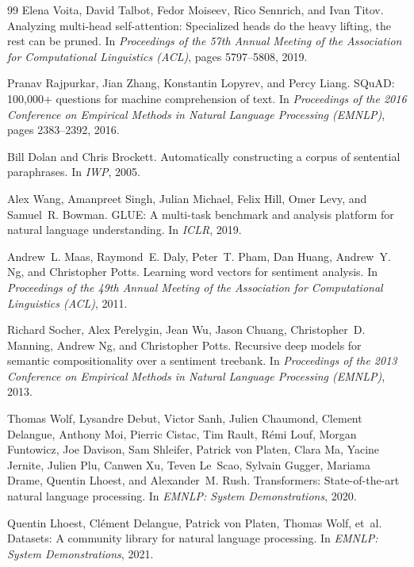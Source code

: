 \documentclass[11pt,a4paper]{article}
\begin{document}
\begin{thebibliography}{99}
Elena Voita, David Talbot, Fedor Moiseev, Rico Sennrich, and Ivan Titov.
Analyzing multi-head self-attention: Specialized heads do the heavy lifting, the rest can be pruned.
In \emph{Proceedings of the 57th Annual Meeting of the Association for Computational Linguistics (ACL)}, pages 5797--5808, 2019.

Pranav Rajpurkar, Jian Zhang, Konstantin Lopyrev, and Percy Liang.
{SQuAD}: 100,000+ questions for machine comprehension of text.
In \emph{Proceedings of the 2016 Conference on Empirical Methods in Natural Language Processing (EMNLP)}, pages 2383--2392, 2016.

Bill Dolan and Chris Brockett.
Automatically constructing a corpus of sentential paraphrases.
In \emph{IWP}, 2005.

Alex Wang, Amanpreet Singh, Julian Michael, Felix Hill, Omer Levy, and Samuel~R. Bowman.
{GLUE}: A multi-task benchmark and analysis platform for natural language understanding.
In \emph{ICLR}, 2019.

Andrew~L. Maas, Raymond~E. Daly, Peter~T. Pham, Dan Huang, Andrew~Y. Ng, and Christopher Potts.
Learning word vectors for sentiment analysis.
In \emph{Proceedings of the 49th Annual Meeting of the Association for Computational Linguistics (ACL)}, 2011.

Richard Socher, Alex Perelygin, Jean Wu, Jason Chuang, Christopher~D. Manning, Andrew Ng, and Christopher Potts.
Recursive deep models for semantic compositionality over a sentiment treebank.
In \emph{Proceedings of the 2013 Conference on Empirical Methods in Natural Language Processing (EMNLP)}, 2013.

Thomas Wolf, Lysandre Debut, Victor Sanh, Julien Chaumond, Clement Delangue, Anthony Moi, Pierric Cistac, Tim Rault, R\'{e}mi Louf, Morgan Funtowicz, Joe Davison, Sam Shleifer, Patrick von Platen, Clara Ma, Yacine Jernite, Julien Plu, Canwen Xu, Teven Le~Scao, Sylvain Gugger, Mariama Drame, Quentin Lhoest, and Alexander~M. Rush.
Transformers: State-of-the-art natural language processing.
In \emph{EMNLP: System Demonstrations}, 2020.

Quentin Lhoest, Cl\'{e}ment Delangue, Patrick von Platen, Thomas Wolf, et~al.
Datasets: A community library for natural language processing.
In \emph{EMNLP: System Demonstrations}, 2021.

\end{thebibliography}
\end{document}
